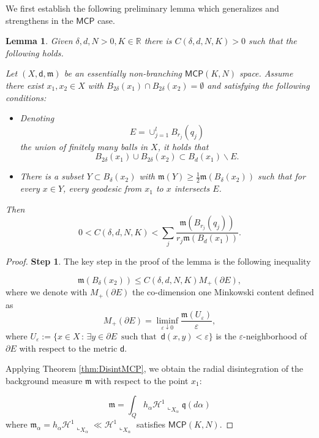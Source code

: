 \documentclass[a4paper]{amsart}
\theoremstyle{plain}
\newtheorem{lemma}{Lemma}[section]
\theoremstyle{definition}
\numberwithin{equation}{section}
\newcommand{\R}{\mathbb{R}}
\newcommand{\ve}{\varepsilon}
\newcommand{\MCP}{\mathsf{MCP}}
\newcommand{\mm}{\mathfrak m}
\newcommand{\sfd}{\mathsf d}
\newcommand{\cH}{\mathcal{H}}
\begin{document}
{We first establish the following preliminary lemma
which generalizes and strengthens \cite[Lemma 3.1]{CC00a} in the  $\MCP$ case. 

\begin{lemma}\label{lem-vol-est-col}  
Given $\delta,d,N>0,K\in\R$ there is $C(\delta,d,N,K)>0$ such that the following holds.

Let $(X,\sfd,\mm)$ be an  { essentially non-branching $\MCP(K,N)$ space}. Assume there exist $x_1,x_2\in X$ with $B_{2\delta}(x_1)\cap B_{2\delta}(x_2)=\emptyset$ and satisfying the following conditions:

\begin{itemize}
\item  Denoting $$E=\cup_{j=1}^lB_{r_j}(q_j)$$ the union of finitely many balls in $X$, it holds that
\[
B_{2\delta}(x_1)\cup B_{2\delta}(x_2)\subset B_d(x_1)\backslash E.
\]
\item There is a subset $Y\subset  B_\delta(x_2)$ with $\mm(Y)\ge \frac{1}{2}\mm( B_\delta(x_2))$ such that for every $x\in Y$,  every geodesic from $x_{1}$ to $x$   intersects $E$.
\end{itemize}
Then
\[
0<C(\delta,d,N,K)<\sum_j\frac{\mm( B_{r_j}(q_j))}{r_j \mm(B_d(x_1))}.
\]
\end{lemma}
\begin{proof}


\textbf{Step 1}. The key step in the proof of the lemma is the following inequality

\begin{equation}\label{content-ineq-col}
\mm( B_\delta(x_2))\le C(\delta,d,N,K) M_{+}(\partial E),
\end{equation}
where we denote with $ M_{+}(\partial E)$ the co-dimension one Minkowski content defined as
\begin{equation}\label{def:MinkCont}
M_{+}(\partial E)=\liminf_{\ve\downarrow 0} \frac{\mm(U_\ve)}{\ve},
\end{equation}
where $U_{\ve}:=\{x \in X \,:\, \exists y \in  \partial E \, \text{ such that } \, \sfd(x,y)< \ve \}$ is the $\ve$-neighborhood of $\partial E$ with respect to the metric $\sfd$.

 Applying  Theorem \ref{thm:DisintMCP}, we obtain  the radial disintegration of the background measure $\mm$ with respect to the point $x_1$:

\[
\mm=\int_Q h_\alpha \mathcal H^1\llcorner_{X_\alpha}\mathfrak q(d\alpha)
\]
where $\mm_\alpha= h_\alpha  \cH^1\llcorner_{X_\alpha} \ll \cH^1\llcorner_{X_\alpha}$ satisfies $\MCP(K,N)$.


\end{proof}}
\end{document}
